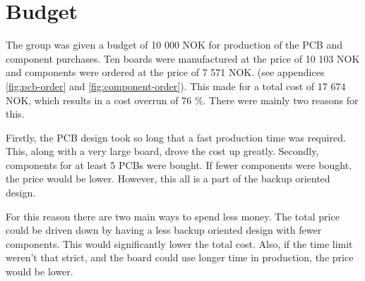 \documentclass[../main/report.tex]{subfiles}
\begin{document}
\section{Budget}

The group was given a budget of 10 000 NOK for production of the PCB and component purchases. 
Ten boards were manufactured at the price of 10 103 NOK and components were ordered at the price of 7 571 NOK. (see appendices \ref{fig:pcb-order} and \ref{fig:component-order}).
This made for a total cost of 17 674 NOK, which results in a cost overrun of 76 \%.
There were mainly two reasons for this.

Firstly, the PCB design took so long that a fast production time was required.
This, along with a very large board, drove the cost up greatly.
Secondly, components for at least 5 PCBs were bought.
If fewer components were bought, the price would be lower.
However, this all is a part of the backup oriented design.

For this reason there are two main ways to spend less money.
The total price could be driven down by having a less backup oriented design with fewer components.
This would significantly lower the total cost.
Also, if the time limit weren't that strict, and the board could use longer time in production, the price would be lower.
\end{document}
